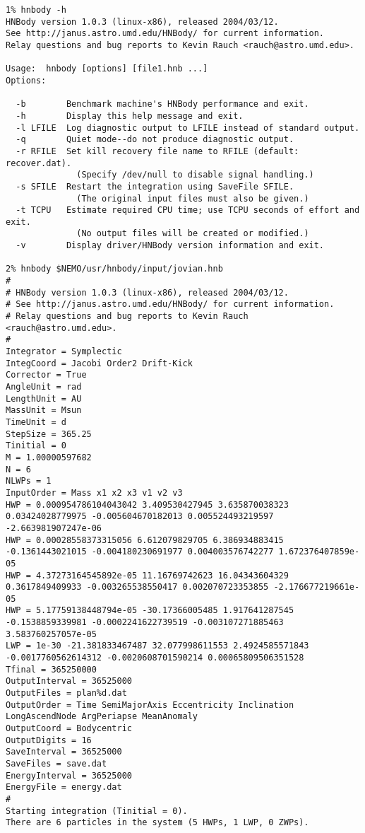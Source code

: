 \footnotesize\begin{verbatim}
1% hnbody -h
HNBody version 1.0.3 (linux-x86), released 2004/03/12.
See http://janus.astro.umd.edu/HNBody/ for current information.
Relay questions and bug reports to Kevin Rauch <rauch@astro.umd.edu>.
 
Usage:  hnbody [options] [file1.hnb ...]
Options:
 
  -b        Benchmark machine's HNBody performance and exit.
  -h        Display this help message and exit.
  -l LFILE  Log diagnostic output to LFILE instead of standard output.
  -q        Quiet mode--do not produce diagnostic output.
  -r RFILE  Set kill recovery file name to RFILE (default: recover.dat).
              (Specify /dev/null to disable signal handling.)
  -s SFILE  Restart the integration using SaveFile SFILE.
              (The original input files must also be given.)
  -t TCPU   Estimate required CPU time; use TCPU seconds of effort and exit.
              (No output files will be created or modified.)
  -v        Display driver/HNBody version information and exit.

2% hnbody $NEMO/usr/hnbody/input/jovian.hnb
#
# HNBody version 1.0.3 (linux-x86), released 2004/03/12.
# See http://janus.astro.umd.edu/HNBody/ for current information.
# Relay questions and bug reports to Kevin Rauch <rauch@astro.umd.edu>.
#
Integrator = Symplectic
IntegCoord = Jacobi Order2 Drift-Kick
Corrector = True
AngleUnit = rad
LengthUnit = AU
MassUnit = Msun
TimeUnit = d
StepSize = 365.25
Tinitial = 0
M = 1.00000597682
N = 6
NLWPs = 1
InputOrder = Mass x1 x2 x3 v1 v2 v3
HWP = 0.000954786104043042 3.409530427945 3.635870038323 0.03424028779975 -0.005604670182013 0.005524493219597 -2.663981907247e-06
HWP = 0.00028558373315056 6.612079829705 6.386934883415 -0.1361443021015 -0.004180230691977 0.004003576742277 1.672376407859e-05
HWP = 4.37273164545892e-05 11.16769742623 16.04343604329 0.3617849409933 -0.003265538550417 0.002070723353855 -2.176677219661e-05
HWP = 5.17759138448794e-05 -30.17366005485 1.917641287545 -0.1538859339981 -0.0002241622739519 -0.003107271885463 3.583760257057e-05
LWP = 1e-30 -21.381833467487 32.077998611553 2.4924585571843 -0.0017760562614312 -0.0020608701590214 0.00065809506351528
Tfinal = 365250000
OutputInterval = 36525000
OutputFiles = plan%d.dat
OutputOrder = Time SemiMajorAxis Eccentricity Inclination LongAscendNode ArgPeriapse MeanAnomaly
OutputCoord = Bodycentric
OutputDigits = 16
SaveInterval = 36525000
SaveFiles = save.dat
EnergyInterval = 36525000
EnergyFile = energy.dat
#
Starting integration (Tinitial = 0).
There are 6 particles in the system (5 HWPs, 1 LWP, 0 ZWPs).
 

\end{verbatim}
